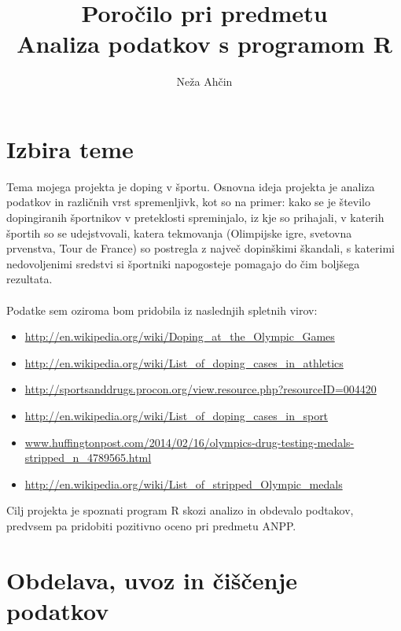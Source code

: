 \documentclass[11pt,a4paper]{article}
\begin{document}
\title{Poročilo pri predmetu \\
Analiza podatkov s programom R}
\author{Neža Ahčin}
\maketitle

\newpage

\section{Izbira teme}

Tema mojega projekta je doping v športu. Osnovna ideja projekta je analiza podatkov in različnih vrst spremenljivk, kot so na primer: kako se je število dopingiranih športnikov v preteklosti spreminjalo, iz kje so prihajali, v katerih športih so se udejstvovali, katera tekmovanja (Olimpijske igre, svetovna prvenstva, Tour de France) so postregla z največ dopinškimi škandali, s katerimi nedovoljenimi sredstvi si športniki napogosteje pomagajo do čim boljšega rezultata.
\\
\\
Podatke sem oziroma bom pridobila iz naslednjih spletnih virov:

\begin{itemize} 
\item \url{http://en.wikipedia.org/wiki/Doping_at_the_Olympic_Games}
\item \url{http://en.wikipedia.org/wiki/List_of_doping_cases_in_athletics}
\item \url{http://sportsanddrugs.procon.org/view.resource.php?resourceID=004420}
\item \url{http://en.wikipedia.org/wiki/List_of_doping_cases_in_sport}
\item \url{www.huffingtonpost.com/2014/02/16/olympics-drug-testing-medals-stripped_n_4789565.html}
\item \url{http://en.wikipedia.org/wiki/List_of_stripped_Olympic_medals}
\end{itemize}
Cilj projekta je spoznati program R skozi analizo in obdevalo podtakov, predvsem pa pridobiti pozitivno oceno pri predmetu ANPP.
\newpage
\section{Obdelava, uvoz in čiščenje podatkov}
\end{document}

